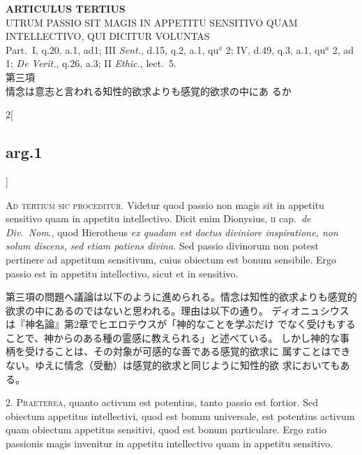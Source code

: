 \documentclass[paper=a4paper,fontsize=10pt,jafontsize=9pt,titlepage]{jlreq}
\begin{document}
\begin{center}
 {\Large {\bfseries ARTICULUS TERTIUS}}\\
 {\large UTRUM PASSIO SIT MAGIS IN APPETITU SENSITIVO QUAM
 INTELLECTIVO, QUI DICITUR VOLUNTAS}\\
 {\footnotesize Part.~I, q.20, a.1, ad1; III {\itshape Sent.}, d.15,
 q.2, a.1, qu$^a$ 2; IV, d.49, q.3, a.1, qu$^a$ 2, ad 1; {\itshape De
 Verit.}, q.26, a.3; II {\itshape Ethic.}, lect.~5.}\\
 {\Large 第三項\\情念は意志と言われる知性的欲求よりも感覚的欲求の中にあ
 るか}
\end{center}

\begin{paracol}{2}[\subsection{arg.1}]

{\scshape Ad tertium sic proceditur}. Videtur quod passio non magis sit in appetitu
sensitivo quam in appetitu intellectivo. Dicit enim Dionysius, {\scshape ii}
cap.~{\itshape de Div.~Nom}., quod Hierotheus {\itshape ex quadam est doctus diviniore
inspiratione, non solum discens, sed etiam patiens divina}. Sed passio
divinorum non potest pertinere ad appetitum sensitivum, cuius obiectum
est bonum sensibile. Ergo passio est in appetitu intellectivo, sicut et
in sensitivo.

\switchcolumn

第三項の問題へ議論は以下のように進められる。情念は知性的欲求よりも感覚的
 欲求の中にあるのではないと思われる。理由は以下の通り。
ディオニュシウスは『神名論』第2章でヒエロテウスが「神的なことを学ぶだけ
 でなく受けもすることで、神からのある種の霊感に教えられる」と述べている。
 しかし神的な事柄を受けることは、その対象が可感的な善である感覚的欲求に
 属すことはできない。ゆえに情念（受動）は感覚的欲求と同じように知性的欲
 求においてもある。


2. {\scshape Praeterea}, quanto activum est potentius, tanto passio est fortior. Sed
obiectum appetitus intellectivi, quod est bonum universale, est
potentius activum quam obiectum appetitus sensitivi, quod est bonum
particulare. Ergo ratio passionis magis invenitur in appetitu
intellectivo quam in appetitu sensitivo.


\end{paracol}
\end{document}
